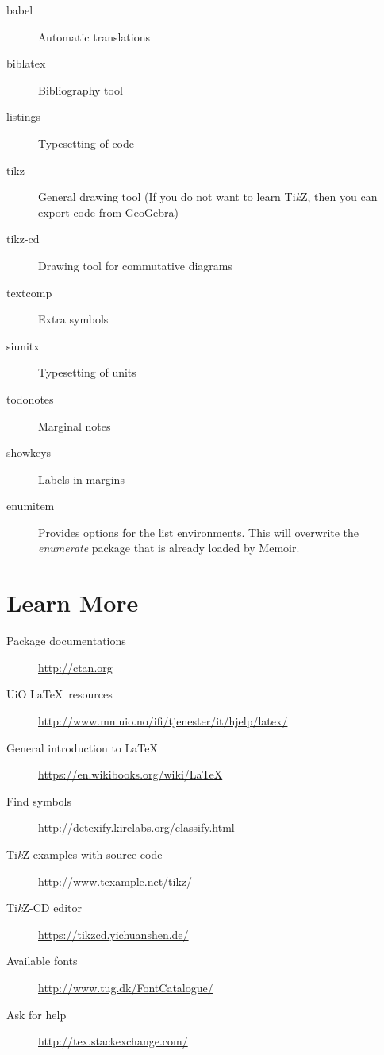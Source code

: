 \documentclass[a4paper]{memoir}
\begin{document}
\begin{description}
    \item[babel]
    Automatic translations

    \item[biblatex]
    Bibliography tool

    \item[listings]
    Typesetting of code

    \item[tikz]
    General drawing tool (If you do not want to learn Ti\textit{k}Z, then you can export code from GeoGebra)

    \item[tikz-cd]
    Drawing tool for commutative diagrams

    \item[textcomp]
    Extra symbols

    \item[siunitx]
    Typesetting of units

    \item[todonotes]
    Marginal notes

    \item[showkeys]
    Labels in margins

    \item[enumitem]
    Provides options for the list environments. This will overwrite the \emph{enumerate} package that is already loaded by Memoir.
\end{description}


\chapter{Learn More}


\begin{description}
    \item[Package documentations]
    \url{http://ctan.org}

    \item[UiO \LaTeX\ resources]
    \url{http://www.mn.uio.no/ifi/tjenester/it/hjelp/latex/}

    \item[General introduction to \LaTeX]
    \url{https://en.wikibooks.org/wiki/LaTeX}

    \item[Find symbols]
    \url{http://detexify.kirelabs.org/classify.html}

    \item[Ti\textit{k}Z examples with source code]
    \url{http://www.texample.net/tikz/}

    \item[Ti\textit{k}Z-CD editor]
    \url{https://tikzcd.yichuanshen.de/}

    \item[Available fonts]
    \url{http://www.tug.dk/FontCatalogue/}

    \item[Ask for help]
    \url{http://tex.stackexchange.com/}
\end{description}
\end{document}
